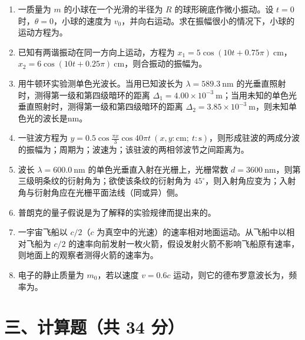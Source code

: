 \documentclass[zihao=5,a4paper,UTF8]{ctexart}
\newcommand{\blank}[1][2.5cm]{\underline{\hspace{#1}}}
\begin{document}
\begin{enumerate}[leftmargin=2em, itemsep=6pt, start=11]
    \item 一质量为 $m$ 的小球在一个光滑的半径为 $R$ 的球形碗底作微小振动。设 $t=0$ 时，$\theta=0$，小球的速度为 $v_0$，并向右运动。求在振幅很小的情况下，小球的运动方程为\blank[4.0cm]。

    \item 已知有两谐振动在同一方向上运动，方程为 $x_1 = 5\cos(10t + 0.75\pi)\ \mathrm{cm}$，$x_2 = 6\cos(10t + 0.25\pi)\ \mathrm{cm}$，则合振动的振幅为\blank[2.5cm]。

    \item 用牛顿环实验测单色光波长。当用已知波长为 $\lambda = 589.3\ \mathrm{nm}$ 的光垂直照射时，测得第一级和第四级暗环的距离 $\Delta_1 = 4.00\times 10^{-3}\ \mathrm{m}$；当用未知的单色光垂直照射时，测得第一级和第四级暗环的距离 $\Delta_2 = 3.85\times 10^{-3}\ \mathrm{m}$，则未知单色光的波长是\blank[2.2cm]$\mathrm{nm}$。

    \item 一驻波方程为 $y = 0.5\cos\frac{\pi x}{3}\cos 40\pi t\ (x,y:\mathrm{cm};\ t:\mathrm{s})$，则形成驻波的两成分波的振幅为\blank[1.8cm]；周期为\blank[1.8cm]；波速为\blank[2.0cm]；该驻波的两相邻波节之间距离为\blank[1.8cm]。

    \item 波长 $\lambda = 600.0\ \mathrm{nm}$ 的单色光垂直入射在光栅上，光栅常数 $d=3600\ \mathrm{nm}$，则第三级明条纹的衍射角为\blank[1.8cm]；欲使该条纹的衍射角为 $45^\circ$，则入射角应变为\blank[2.0cm]；入射角与衍射角应在光栅平面法线\blank[1.5cm]（同或异）侧。

    \item 普朗克的量子假说是为了解释\blank[3.0cm]的实验规律而提出来的。

    \item 一宇宙飞船以 $c/2$（$c$ 为真空中的光速）的速率相对地面运动。从飞船中以相对飞船为 $c/2$ 的速率向前发射一枚火箭，假设发射火箭不影响飞船原有速率，则地面上的观察者测得火箭的速率为\blank[2.5cm]。

    \item 电子的静止质量为 $m_0$，若以速度 $v = 0.6c$ 运动，则它的德布罗意波长为\blank[2.5cm]，频率为\blank[2.5cm]。
\end{enumerate}

\section*{三、计算题（共 34 分）}
\end{document}
